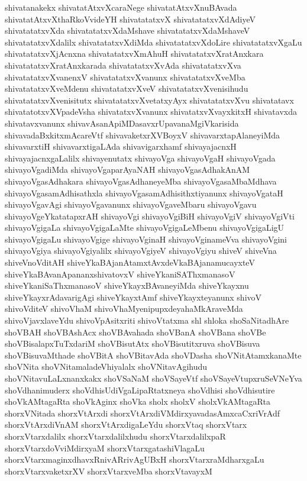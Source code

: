 {shivatanakekx
shivatatAtxvXcaraNege
shivatatAtxvXnuBAvada
shivatatAtxvXthaRkoVvideYH
shivatatatxvX
shivatatatxvXdAdiyeV
shivatatatxvXda
shivatatatxvXdaMshave
shivatatatxvXdaMshaveV
shivatatatxvXdalilx
shivatatatxvXdiMda
shivatatatxvXdoLire
shivatatatxvXgaLu
shivatatatxvXjAcnxna
shivatatatxvXmAhuH
shivatatatxvXratAnxkara
shivatatatxvXratAnxkarada
shivatatatxvXvAda
shivatatatxvXva
shivatatatxvXvanenxV
shivatatatxvXvanunx
shivatatatxvXveMba
shivatatatxvXveMdenu
shivatatatxvXveV
shivatatatxvXvenisihudu
shivatatatxvXvenisitutx
shivatatatxvXvetatxyAyx
shivatatatxvXvu
shivatatavx
shivatatotxvXVpadeVsha
shivatatxvXvanunx
shivatatxvXvayxkitxH
shivatavxda
shivatavxvanunx
shivavAsanApiMDasavxrUpavanaMgiVkarisida
shivavadaBxkitxmAcareVtf
shivavaketxrXVBoyxV
shivavarxtapAlaneyiMda
shivavarxtiH
shivavarxtigaLAda
shivavigarxhamf
shivayajacnxH
shivayajacnxgaLalilx
shivayenutatx
shivayoVga
shivayoVgaH
shivayoVgada
shivayoVgadiMda
shivayoVgaparAyaNAH
shivayoVgasAdhakAnAM
shivayoVgasAdhakara
shivayoVgasAdhaneyeMba
shivayoVgasaMbaMdhava
shivayoVgasamAdhisathxla
shivayoVgasamAdhisithxtiyanunx
shivayoVgataH
shivayoVgavAgi
shivayoVgavanunx
shivayoVgaveMbaru
shivayoVgavu
shivayoVgeYkatatapxrAH
shivayoVgi
shivayoVgiBiH
shivayoVgiV
shivayoVgiVti
shivayoVgigaLa
shivayoVgigaLaMte
shivayoVgigaLeMbenu
shivayoVgigaLigU
shivayoVgigaLu
shivayoVgige
shivayoVginaH
shivayoVginameVva
shivayoVgini
shivayoVgiya
shivayoVgiyalilx
shivayoVgiyeV
shivayoVgiyu
shiveV
shiveVna
shiveVnoVditAH
shiveYkaBAjanAtamxtAvxdeVkaBAjanamucayxteV
shiveYkaBAvanApananxshivatovxV
shiveYkaniSAThxmanasoV
shiveYkaniSaThxmanasoV
shiveYkayxBAvaneyiMda
shiveYkayxnu
shiveYkayxrAdavarigAgi
shiveYkayxtAmf
shiveYkayxteyanunx
shivoV
shivoVditeV
shivoVhaM
shivoVhaMyenipupxdeyahaMkAraveMda
shivoVjavxlaveYdu
shivoVpAsitxriti
shivoVtatxma
shl
shloka
shoSaNitadhAre
shoVBAH
shoVBAshAcx
shoVBAvahada
shoVBanA
shoVBana
shoVBe
shoVBisalapxTuTxdariM
shoVBisutAtx
shoVBisutitxruva
shoVBisuva
shoVBisuvaMthade
shoVBitA
shoVBitavAda
shoVDasha
shoVNitAtamxkanaMte
shoVNita
shoVNitamaladeVhiyalalx
shoVNitavAgihudu
shoVNitavuLaLxnanxkakx
shoVSaNaM
shoVSayeVtf
shoVSayeVtupxruSeVNeYva
shoVdhanimuderx
shoVdhisUdiVgaLipaRtatxneya
shoVdhisi
shoVdhisutire
shoVkAMtagaRta
shoVkAginx
shoVka
sholx
sholxV
sholxVkAMtagaRta
shorxVNitada
shorxVtArxdi
shorxVtArxdiVMdirxyavadasAmxcaCxriVrAdf
shorxVtArxdiVnAM
shorxVtArxdigaLeYdu
shorxVtaq
shorxVtarx
shorxVtarxdalilx
shorxVtarxdalilxhudu
shorxVtarxdalilxpaR
shorxVtarxdoVviMdirxyaM
shorxVtarxgatashiVlagaLu
shorxVtarxmaginxdhavxRnivARrivAgUBxH
shorxVtarxraMdharxgaLu
shorxVtarxvaketxrXV
shorxVtarxveMba
shorxVtavayxM
}
